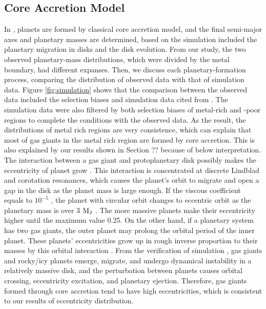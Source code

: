 \documentclass[twocolumn, dvipdfmx]{aastex62}
\begin{document}
\begin{CJK*}{UTF8}{min}
\subsection{Core Accretion Model} \label{subsec:accretion}

In \cite{2012A&A...541A..97M}, planets are formed by classical core accretion model, and the final semi-major axes and planetary masses are determined, based on the simulation included the planetary migration in disks and the disk evolution. From our study, the two observed planetary-mass distributions, which were divided by the metal boundary, had different expanses. Then, we discuss each planetary-formation process, comparing the distribution of observed data with that of simulation data. Figure \ref{fig:simulation} shows that the comparison between the observed data included the selection biases and simulation data cited from \cite{2012A&A...541A..97M}. The simulation data were also filtered by both selection biases of metal-rich and -poor regions to complete the conditions with the observed data. As the result, the distributions of metal rich regions are very consistence, which can explain that most of gas giants in the metal rich region are formed by core accretion. This is also explained by our results shown in Section ??  because of below interpretation. The interaction between a gas giant and protoplanetary disk possibly makes the eccentricity of planet grow \citep[e.g.,][]{2003ApJ...585.1024G, 2006A&A...447..369K}. This interaction is concentrated at discrete Lindblad and corotation resonances, which causes the planet's orbit to migrate and open a gap in the disk as the planet mass is large enough. If the viscous coefficient equals to $10^{-5}$ , the planet with circular orbit changes to eccentric orbit as the planetary mass is over 3 $\rm M_J$ . The more massive planets make their eccentricity higher until the maximum value 0.25. On the other hand, if a planetary system has two gas giants, the outer planet may prolong the orbital period of the inner planet. These planets' eccentricities grow up in rough inverse proportion to their masses by this orbital interaction \citep{2002ApJ...564L.105C}. From the verification of simulation \citep{2013ApJ...775...42I}, gas giants and rocky/icy planets emerge, migrate, and undergo dynamical instability in a relatively massive disk, and the perturbation between planets causes orbital crossing, eccentricity excitation, and planetary ejection. Therefore, gas giants formed through core accretion tend to have high eccentricities, which is consistent to our results of eccentricity distribution.


\end{CJK*}
\end{document}
